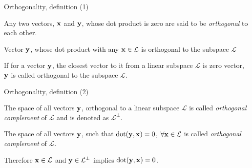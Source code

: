 \documentclass{beamer}
\begin{document}
\begin{frame}{Orthogonality, definition (1)}
	\begin{flushleft}
		
		\begin{definition}
			Any two vectors, $\mathbf{x}$ and $\mathbf{y}$, whose dot product is zero are said to be \emph{orthogonal} to each other.
		\end{definition}
		
		\begin{definition}
			Vector $\mathbf{y}$, whose dot product with any $\mathbf{x} \in \mathcal{L}$ is orthogonal to the subspace $\mathcal{L}$
		\end{definition}
		
		\begin{definition}
			If for a vector $\mathbf{y}$, the closest vector to it from a linear subspace $\mathcal{L}$ is zero vector, $\mathbf{y}$ is called orthogonal to the subspace $\mathcal{L}$.
		\end{definition}
		
		
	\end{flushleft}
\end{frame}


\begin{frame}{Orthogonality, definition (2)}
	\begin{flushleft}
		
		\begin{definition}
			The space of all vectors $\mathbf{y}$, orthogonal to a linear subspace $\mathcal{L}$ is called \emph{orthogonal complement} of $\mathcal{L}$ and is denoted as $\mathcal{L}^\perp$.
		\end{definition}
		
		
		\begin{definition}[equivalent]
			The space of all vectors $\mathbf{y}$, such that $\text{dot}(\mathbf{y}, \mathbf{x}) = 0$, $\forall \mathbf{x} \in \mathcal{L}$ is called \emph{orthogonal complement} of $\mathcal{L}$.
		\end{definition}
		
		Therefore $\mathbf{x} \in \mathcal{L}$ and $\mathbf{y} \in \mathcal{L}^\perp$ implies $\text{dot}(\mathbf{y}, \mathbf{x}) = 0$.
		
	\end{flushleft}
\end{frame}
\end{document}

